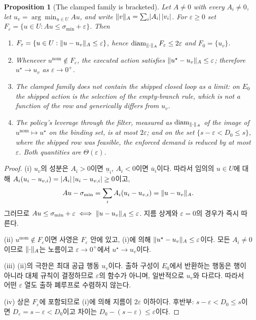 \documentclass[11pt]{article}
\theoremstyle{plain}
\newtheorem{proposition}[theorem]{Proposition}
\theoremstyle{definition}
\theoremstyle{remark}
\DeclarePairedDelimiter{\norm}{\lVert}{\rVert}
\DeclarePairedDelimiter{\abs}{\lvert}{\rvert}
\begin{document}
\begin{proposition}[The clamped family is bracketed]\label{prop:clamp-bracket}
Let $A \neq 0$ with every $A_i \neq 0$, let $u_v = \arg\min_{u\in U} Au$, and write
$\norm{v}_A = \sum_i \abs{A_i}\,\abs{v_i}$. For $\varepsilon \ge 0$ set
$F_\varepsilon = \{u \in U : Au \le \sigma_{\min} + \varepsilon\}$. Then
\begin{enumerate}
\item[(i)] $F_\varepsilon = \{u \in U : \norm{u - u_v}_A \le \varepsilon\}$, hence
$\operatorname{diam}_{\norm{\cdot}_A} F_\varepsilon \le 2\varepsilon$ and
$F_0 = \{u_v\}$.
\item[(ii)] Whenever $u^{\mathrm{nom}} \notin F_\varepsilon$, the executed action
satisfies $\norm{u^\star - u_v}_A \le \varepsilon$; therefore $u^\star \to u_v$ as
$\varepsilon \to 0^+$.
\item[(iii)] The clamped family does not contain the shipped closed loop as a
limit: on $E_0$ the shipped action is the selection of the empty-branch rule,
which is not a function of the row and generically differs from $u_v$.
\item[(iv)] The policy's leverage through the filter, measured as
$\operatorname{diam}_{\norm{\cdot}_A}$ of the image of $u^{\mathrm{nom}} \mapsto u^\star$
on the binding set, is at most $2\varepsilon$; and on the set
$\{s - \varepsilon < D_0 \le s\}$, where the shipped row was feasible, the enforced
demand is reduced by at most $\varepsilon$. Both quantities are $\Theta(\varepsilon)$.
\end{enumerate}
\end{proposition}
\begin{proof}
(i) $u_v$의 성분은 $A_i > 0$이면 $\underline u_i$, $A_i < 0$이면 $\overline u_i$이다.
따라서 임의의 $u \in U$에 대해 $A_i (u_i - u_{v,i}) = \abs{A_i}\,\abs{u_i - u_{v,i}} \ge 0$이고,
\[
Au - \sigma_{\min} = \sum_i A_i (u_i - u_{v,i}) = \norm{u - u_v}_A .
\]
그러므로 $Au \le \sigma_{\min} + \varepsilon \iff \norm{u-u_v}_A \le \varepsilon$.
지름 상계와 $\varepsilon = 0$의 경우가 즉시 따른다.

(ii) $u^{\mathrm{nom}} \notin F_\varepsilon$이면 사영은 $F_\varepsilon$ 안에 있고,
(i)에 의해 $\norm{u^\star - u_v}_A \le \varepsilon$이다. 모든 $A_i \neq 0$이므로
$\norm{\cdot}_A$는 노름이고 $\varepsilon \to 0^+$에서 $u^\star \to u_v$이다.

(iii) (ii)의 극한은 최대 공급 행동 $u_v$이다. 출하 구성이 $E_0$에서 반환하는
행동은 행이 아니라 대체 규칙이 결정하므로 $\varepsilon$의 함수가 아니며, 일반적으로
$u_v$와 다르다. 따라서 어떤 $\varepsilon$ 열도 출하 폐루프로 수렴하지 않는다.

(iv) 상은 $F_\varepsilon$에 포함되므로 (i)에 의해 지름이 $2\varepsilon$ 이하이다.
후반부: $s - \varepsilon < D_0 \le s$이면 $D_\varepsilon = s - \varepsilon < D_0$이고
차이는 $D_0 - (s-\varepsilon) \le \varepsilon$이다.
\end{proof}
\end{document}
